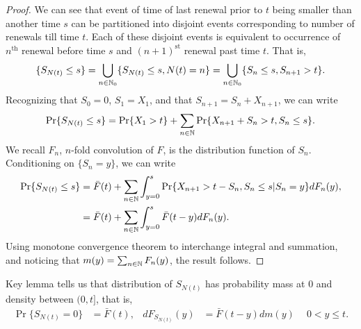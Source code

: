 \documentclass[a4paper,10pt,english]{article}
\begin{document}
\begin{proof} We can see that event of time of last renewal prior to $t$ being smaller than another time $s$ can be partitioned into disjoint events corresponding to number of renewals till time $t$. Each of these disjoint events is equivalent to occurrence of $n^{\mathrm{th}}$ renewal before time $s$ and $(n+1)^{\mathrm{st}}$ renewal past time $t$. That is,
\begin{equation*}
	\{S_{N(t)} \leq s\} = \bigcup_{n \in \mathbb{N}_0}\{ S_{N(t)} \leq s, N(t)=n\} = \bigcup_{n \in \mathbb{N}_0}\{ S_n \leq s, S_{n+1} > t\} .
\end{equation*}
Recognizing that $S_0 = 0$, $S_1 = X_1$, and that $S_{n+1} = S_n + X_{n+1}$, we can write
\begin{equation*}
	\Pr\{S_{N(t)} \leq s\} = \Pr\{X_1 > t\} + \sum_{n \in \mathbb{N}}\Pr\{ X_{n+1} + S_n > t, S_n \leq s\} .
\end{equation*}
We recall $F_n$, $n$-fold convolution of $F$, is the distribution function of $S_n$. Conditioning on $\{S_n = y\}$, we can write
\begin{align*}
	\Pr\{S_{N(t)} \leq s\} &= \bar{F}(t) + \sum_{n \in \mathbb{N}}\int_{y=0}^{s}\Pr\{ X_{n+1} > t - S_n, S_n \leq s| S_n = y\}dF_n(y),\\
	&= \bar{F}(t) + \sum_{n \in \mathbb{N}}\int_{y=0}^{s}\bar{F}(t-y)dF_n(y).
\end{align*}
Using monotone convergence theorem to interchange integral and summation, and noticing that $m(y) = \sum_{n\in\mathbb{N}}F_n(y)$, the result follows.
\end{proof}
\begin{rem}\label{Remark:DensityLastRenewal} Key lemma tells us that distribution of $S_{N(t)}$ has probability mass at $0$ and density between $(0,t]$, that is,
\begin{align*}
\Pr\{S_{N(t)}=0\}&=\bar{F}(t),& dF_{S_{N(t)}}(y)&=\bar{F}(t-y)dm(y)~\quad 0 < y \leq t.
\end{align*}
\end{rem}
\end{document}
